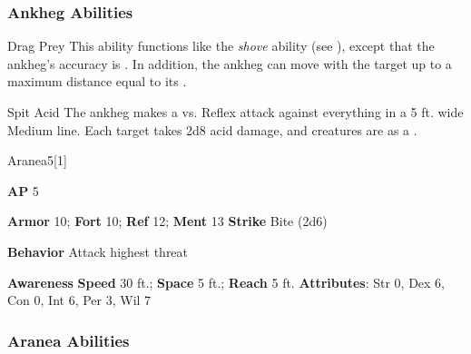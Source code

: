 \subsubsection{Ankheg Abilities}

\begin{ability}{Drag Prey}
This ability functions like the \textit{shove} ability (see ), except that the ankheg's accuracy is .
In addition, the ankheg can move with the target up to a maximum distance equal to its .
\end{ability}

\vspace{0.5em}
\begin{ability}{Spit Acid}
The ankheg makes a  vs. Reflex attack against everything in a 5 ft. wide Medium line.
\hit Each target takes 2d8 acid damage, and creatures are  as a .
\end{ability}






\begin{monsection}{Aranea}{5}[1]
\vspace{-1em}\vspace{-1em}
\begin{spellcontent}
\begin{spelltargetinginfo}
{\textbf{AP} 5}

\pari \textbf{Armor} 10;
\textbf{Fort} 10;
\textbf{Ref} 12;
\textbf{Ment} 13
\pari \textbf{Strike} Bite  (2d6)



\pari \textbf{Behavior} Attack highest threat
\end{spelltargetinginfo}
\end{spellcontent}

\begin{monsterfooter}
\pari \textbf{Awareness} 
\pari \textbf{Speed} 30 ft.;
\textbf{Space} 5 ft.;
\textbf{Reach} 5 ft.
\pari \textbf{Attributes}:
Str 0,
Dex 6,
Con 0,
Int 6,
Per 3,
Wil 7
\end{monsterfooter}
\end{monsection}


\subsubsection{Aranea Abilities}

